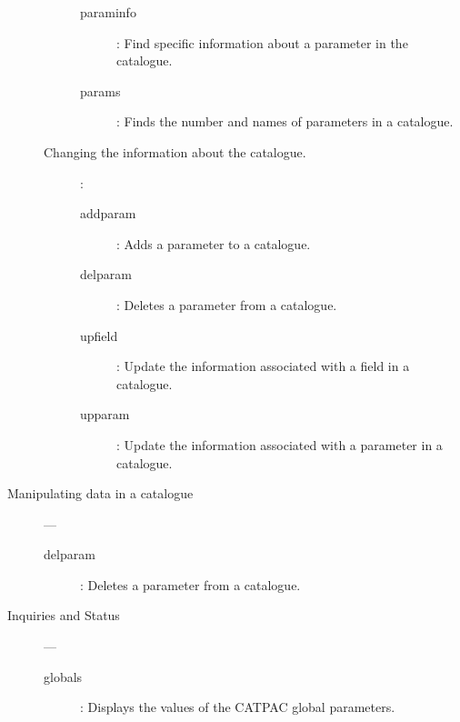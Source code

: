 \begin{description}
\begin{description}
\begin {description}
\item [paraminfo]:
 Find specific information about a parameter in the catalogue.

\item [params]:
 Finds the number and names of parameters in a catalogue.

\end{description}

\item [Changing the information about the catalogue.] :

\begin{description}

\item [addparam]:
 Adds a parameter to a catalogue.

\item [delparam]:
 Deletes a parameter from a catalogue.

\item [upfield]:
 Update the information associated with a field in a catalogue.

\item [upparam]:
 Update the information associated with a parameter in a catalogue.

\end{description}

\end{description}

\item [Manipulating data in a catalogue] ---

\begin{description}

\begin{description}

\item [delparam]:
 Deletes a parameter from a catalogue.

\end{description}

\end{description}

\item [Inquiries and Status] ---

\begin{description}

\begin{description}

\item [globals]:
 Displays the values of the CATPAC global parameters.

\end{description}

\end{description}

\end{description}

